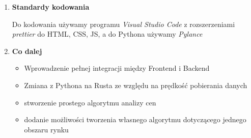 \documentclass[12pt, a4paper]{article}
\begin{document}
\begin{enumerate}[label=\arabic*.]
    \item \textbf{Standardy kodowania} 
            \begin{center}
                Do kodowania używamy programu \textsl{Visual Studio Code} z rozszerzeniami \textsl{prettier} do HTML, CSS, JS, a do Pythona używamy \textsl{Pylance}  
            \end{center}
    
    \item \textbf{Co dalej}
            \begin{itemize}
                \item Wprowadzenie pełnej integracji między Frontend i Backend
                \item Zmiana z Pythona na Rusta ze względu na prędkość pobierania danych
                \item stworzenie prostego algorytmu analizy cen
                \item dodanie możliwości tworzenia własnego algorytmu dotyczącego jednego obszaru rynku 
            \end{itemize}
\end{enumerate}
\end{document}
